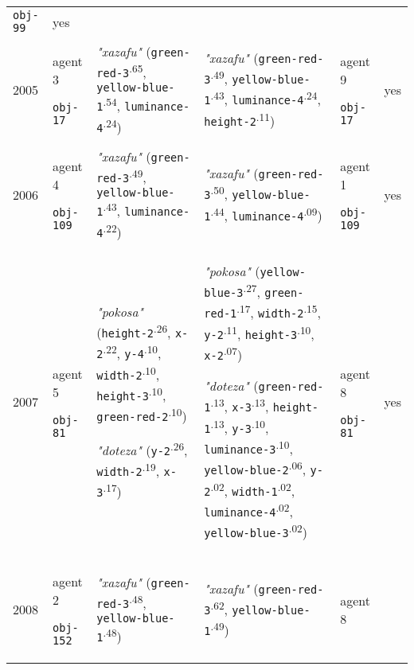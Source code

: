 {\begin{tabular}{@{}p{0.4cm}p{0.85cm}p{6.5cm}p{6.5cm}p{0.85cm}p{0.5cm}@{}}
 \texttt{obj-99} & yes \\
2005 & agent 3 

\texttt{obj-17} &\textit{"xazafu"} (\texttt{green-red-3}\textsuperscript{.65}, \texttt{yellow-blue-1}\textsuperscript{.54}, \texttt{luminance-4}\textsuperscript{.24}) & \textit{"xazafu"} (\texttt{green-red-3}\textsuperscript{.49}, \texttt{yellow-blue-1}\textsuperscript{.43}, \texttt{luminance-4}\textsuperscript{.24}, \texttt{height-2}\textsuperscript{.11}) & agent 9 

 \texttt{obj-17} & yes \\
2006 & agent 4 

\texttt{obj-109} &\textit{"xazafu"} (\texttt{green-red-3}\textsuperscript{.49}, \texttt{yellow-blue-1}\textsuperscript{.43}, \texttt{luminance-4}\textsuperscript{.22}) & \textit{"xazafu"} (\texttt{green-red-3}\textsuperscript{.50}, \texttt{yellow-blue-1}\textsuperscript{.44}, \texttt{luminance-4}\textsuperscript{.09}) & agent 1 

 \texttt{obj-109} & yes \\
2007 & agent 5 

\texttt{obj-81} &\textit{"pokosa"} (\texttt{height-2}\textsuperscript{.26}, \texttt{x-2}\textsuperscript{.22}, \texttt{y-4}\textsuperscript{.10}, \texttt{width-2}\textsuperscript{.10}, \texttt{height-3}\textsuperscript{.10}, \texttt{green-red-2}\textsuperscript{.10})

\textit{"doteza"} (\texttt{y-2}\textsuperscript{.26}, \texttt{width-2}\textsuperscript{.19}, \texttt{x-3}\textsuperscript{.17}) & \textit{"pokosa"} (\texttt{yellow-blue-3}\textsuperscript{.27}, \texttt{green-red-1}\textsuperscript{.17}, \texttt{width-2}\textsuperscript{.15}, \texttt{y-2}\textsuperscript{.11}, \texttt{height-3}\textsuperscript{.10}, \texttt{x-2}\textsuperscript{.07})

\textit{"doteza"} (\texttt{green-red-1}\textsuperscript{.13}, \texttt{x-3}\textsuperscript{.13}, \texttt{height-1}\textsuperscript{.13}, \texttt{y-3}\textsuperscript{.10}, \texttt{luminance-3}\textsuperscript{.10}, \texttt{yellow-blue-2}\textsuperscript{.06}, \texttt{y-2}\textsuperscript{.02}, \texttt{width-1}\textsuperscript{.02}, \texttt{luminance-4}\textsuperscript{.02}, \texttt{yellow-blue-3}\textsuperscript{.02}) & agent 8 

 \texttt{obj-81} & yes \\
2008 & agent 2 

\texttt{obj-152} &\textit{"xazafu"} (\texttt{green-red-3}\textsuperscript{.48}, \texttt{yellow-blue-1}\textsuperscript{.48}) & \textit{"xazafu"} (\texttt{green-red-3}\textsuperscript{.62}, \texttt{yellow-blue-1}\textsuperscript{.49}) & agent 8 


\end{tabular}}

